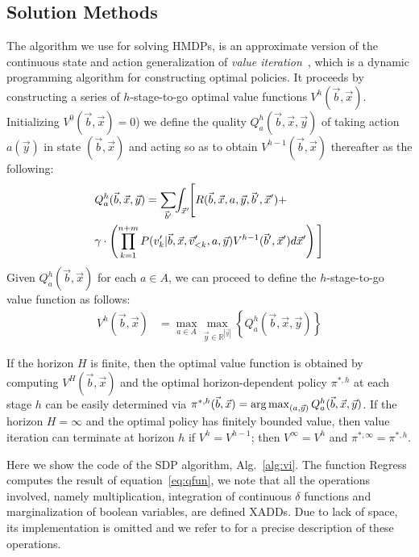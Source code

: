 \subsection{Solution Methods}

\label{sec:soln}

The algorithm we use for solving HMDPs, is an approximate version of the continuous state and action generalization of {\it value iteration}~\cite{bellman}, which is a dynamic programming algorithm for constructing optimal policies.  It proceeds by constructing a series of $h$-stage-to-go optimal value functions $V^h(\vec{b},\vec{x})$.
Initializing $V^0(\vec{b},\vec{x}) = 0$) we define the quality
$Q_a^{h}(\vec{b},\vec{x},\vec{y})$ of taking action $a(\vec{y})$ in state
$(\vec{b},\vec{x})$ and acting so as to obtain $V^{h-1}(\vec{b},\vec{x})$ thereafter as the following:
\vspace{-2.5mm}
{\footnotesize
\begin{align}
& Q_a^{h}(\vec{b},\vec{x},\vec{y}) = \sum_{\vec{b}'} \hspace{-1.0mm} \int_{\vec{x}'} \hspace{-1.0mm} \Bigg[ R(\vec{b},\vec{x},a,\vec{y},\vec{b}',\vec{x}') +  \label{eq:qfun} \\ 
& \gamma \cdot \left( \prod_{k=1}^{n+m} P(v_k'| \vec{b},\vec{x}, \vec{v}'_{<k}, a,\vec{y}) V^{h-1}(\vec{b}',\vec{x}') d\vec{x}' \right)  \Bigg] \nonumber
\end{align}}
Given $Q_a^h(\vec{b},\vec{x})$ for each $a \in A$, we can proceed
to define the $h$-stage-to-go value function as follows:
\begin{align}
V^{h}(\vec{b},\vec{x}) & = \max_{a \in A} \max_{\vec{y} \in \mathbb{R}^{|\vec{y}|}} \left\{ Q^{h}_a(\vec{b},\vec{x},\vec{y}) \right\} \label{eq:vfun}
\end{align}

If the horizon $H$ is finite, then the optimal value function is
obtained by computing $V^H(\vec{b},\vec{x})$ and the optimal
horizon-dependent policy $\pi^{*,h}$ at each stage $h$ can be easily
determined via $\pi^{*,h}(\vec{b},\vec{x}) = \argmax_{(a, \vec{y} )} Q^h_a(\vec{b},\vec{x},\vec{y})$.  If the horizon $H
= \infty$ and the optimal policy has finitely bounded value, then
value iteration can terminate at horizon $h$ if $V^{h} = V^{h-1}$;
then $V^\infty = V^h$ and $\pi^{*,\infty} = \pi^{*,h}$.

Here we show the code of the SDP algorithm, Alg.~\ref{alg:vi}. The function Regress computes the result of equation~\ref{eq:qfun}, we note that all the operations involved, namely multiplication, integration of continuous $\delta$ functions and marginalization of boolean variables, are defined XADDs. Due to lack of space, its implementation is omitted and we refer to \cite{zamani12} for a precise description of these operations.

